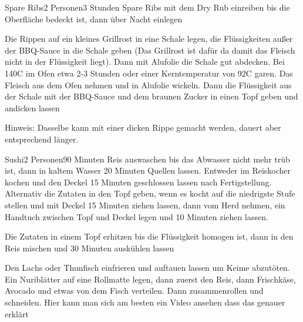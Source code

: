 \begin{recipe}{Spare Ribs}{2 Personen}{3 Stunden}
Spare Ribs mit dem Dry Rub einreiben bis die Oberfläche bedeckt ist, dann über Nacht einlegen

Die Rippen auf ein kleines Grillrost in eine Schale legen, die Flüssigkeiten außer der BBQ-Sauce in die Schale geben (Das Grillrost ist dafür da damit das Fleisch nicht in der Flüssigkeit liegt). Dann mit Alufolie die Schale gut abdecken.
Bei 140\0C im Ofen etwa 2-3 Stunden oder einer Kerntemperatur von 92\0C garen. 
Das Fleisch aus dem Ofen nehmen und in Alufolie wickeln. Dann die Flüssigkeit aus der Schale mit der BBQ-Sauce und dem braunen Zucker in einen Topf geben und andicken lassen

Hinweis: Dasselbe kann mit einer dicken Rippe gemacht werden, dauert aber entsprechend länger.
\end{recipe}


\begin{recipe}{Sushi}{2 Personen}{90 Minuten}
Reis auswaschen bis das Abwasser nicht mehr trüb ist, dann in kaltem Wasser 20 Minuten Quellen lassen. Entweder im Reiskocher kochen und den Deckel 15 Minuten geschlossen lassen nach Fertigstellung. Alternativ die Zutaten in den Topf geben, wenn es kocht auf die niedrigste Stufe stellen und mit Deckel 15 Minuten ziehen lassen, dann vom Herd nehmen, ein Handtuch zwischen Topf und Deckel legen und 10 Minuten ziehen lassen.

Die Zutaten in einem Topf erhitzen bis die Flüssigkeit homogen ist, dann in den Reis mischen und 30 Minuten auskühlen lassen

Den Lachs oder Thunfisch einfrieren und auftauen lassen um Keime abzutöten. Ein Nuriblätter auf eine Rollmatte legen, dann zuerst den Reis, dann Frischkäse, Avocado und etwas von dem Fisch verteilen. Dann zusammenrollen und schneiden. Hier kann man sich am besten ein Video ansehen dass das genauer erklärt
\end{recipe}

